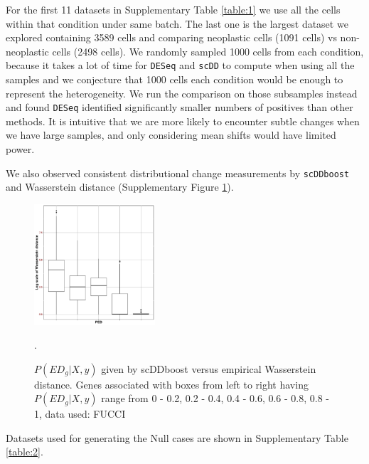 \documentclass[aoas,preprint]{imsart}
\begin{document}
For the first 11 datasets in Supplementary Table \ref{table:1} we use all the cells within that condition under same batch.
The last one is the largest dataset we explored containing 3589 cells and comparing neoplastic cells (1091 cells) vs non-neoplastic cells (2498 cells).
We randomly sampled 1000 cells from each condition, because it takes a lot of time for \texttt{DESeq} and \texttt{scDD} to compute when using all the samples
and we conjecture that 1000 cells each condition would be enough to represent the heterogeneity. %
We run the comparison on those subsamples instead 
and found \texttt{DESeq} identified significantly smaller numbers of positives than other methods. It is intuitive that we are more likely to encounter subtle changes
when we have large samples, and only considering mean shifts would have limited power. 

We also observed consistent distributional change measurements by \texttt{scDDboost} and Wasserstein distance 
(Supplementary Figure \ref{fig:wad}).

\begin{figure}[h!]
\includegraphics[width = 0.4\textwidth]{Figs/Fucci_wadist.pdf}
\caption{$P(ED_g|X,y)$ given by scDDboost versus empirical Wasserstein distance. 
Genes associated with boxes from left to right having $P(ED_g|X,y)$ range from 0 - 0.2, 0.2 - 0.4, 0.4 - 0.6, 0.6 - 0.8, 0.8 - 1, data used: FUCCI}.
 \label{fig:wad}
\end{figure}






Datasets used for generating the Null cases  are shown in Supplementary Table \ref{table:2}.
\end{document}

